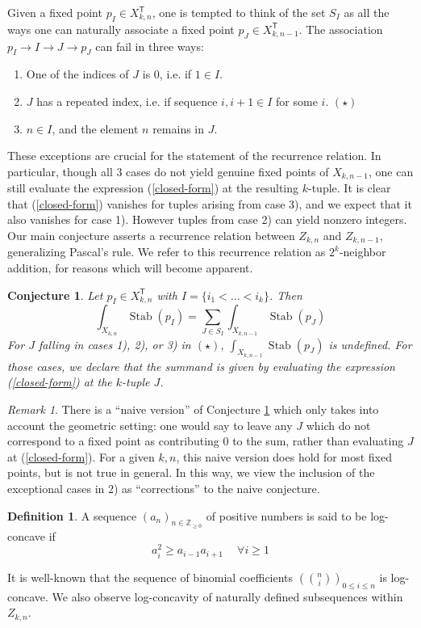 \documentclass[12 pt]{article}
\theoremstyle{plain}
\theoremstyle{plain}
\theoremstyle{plain}
\theoremstyle{plain}
\theoremstyle{plain}
\theoremstyle{plain}
\theoremstyle{plain}
\theoremstyle{plain}
\theoremstyle{plain}
\newtheorem{conjecture}[theorem]{Conjecture}
\theoremstyle{plain}
\theoremstyle{remark}
\newtheorem{remark}{Remark}[section]
\theoremstyle{remark}
\theoremstyle{definition}
\newtheorem{definition}{Definition}[section]
\theoremstyle{definition}
\theoremstyle{definition}
\theoremstyle{definition}
\theoremstyle{definition}
\theoremstyle{definition}
\DeclareMathOperator{\Stab}{Stab}
\newcommand{\bT}{\mathsf{T}}
\begin{document}
Given a fixed point $p_I \in X_{k,n}^\bT$, one is tempted to think of the set $S_I$ as all the ways one can naturally associate a fixed point $p_J\in X_{k,n-1 }^\bT$. The association $p_I\to I \to J \to p_J$ can fail in three ways:
\begin{enumerate}\label{eq:cases}
    \item One of the indices of $J$ is 0, i.e. if $1\in I$.
    \item $J$ has a repeated index, i.e. if sequence $i,i+1 \in I$ for some $i$. \hfill$(\star)$
    \item $n\in I$, and the element $n$ remains in $J$. 
\end{enumerate}
These exceptions are crucial for the statement of the recurrence relation. In particular, though all 3 cases do not yield genuine fixed points of $X_{k,n-1}$, one can still evaluate the expression (\ref{closed-form}) at the resulting $k$-tuple. It is clear that (\ref{closed-form}) vanishes for tuples arising from case 3), and we expect that it also vanishes for case 1). However tuples from case 2) can yield nonzero integers.
Our main conjecture asserts a recurrence relation between $Z_{k,n}$ and $Z_{k,n-1}$, generalizing Pascal's rule. We refer to this recurrence relation as $2^k$-neighbor addition, for reasons which will become apparent. 

\begin{conjecture}\label{2^k-nbr}
Let $p_I\in X_{k,n}^{\bT}$ with $I=\{i_{1}<\dots<i_{k}\}$. Then 
\[
\int_{X_{k,n}}\Stab(p_{I})=\sum_{J\in S_{I}}\int_{X_{k,n-1}}\Stab(p_{J})
\]
For $J$ falling in cases 1), 2), or 3) in $(\star)$, $\int_{X_{k,n-1}}\Stab(p_J)$ is undefined. For those cases, we declare that the summand is given by evaluating the expression (\ref{closed-form}) at the $k$-tuple $J$. 
\end{conjecture}

\begin{remark}
There is a ``naive version'' of Conjecture \ref{2^k-nbr} which only takes into account the geometric setting: one would say to leave any $J$ which do not correspond to a fixed point as contributing 0 to the sum, rather than evaluating $J$ at (\ref{closed-form}). For a given $k,n$, this naive version does hold for most fixed points, but is not true in general. In this way, we view the inclusion of the exceptional cases in 2) as ``corrections'' to the naive conjecture. 
\end{remark}

\begin{definition}
    A sequence $(a_{n})_{n\in\mathbb{Z}_{\geq 0}}$ of positive numbers is said to be log-concave if
    \[
    a_{i}^{2}\geq a_{i-1}a_{i+1}\ \quad \forall i\geq 1
    \]
\end{definition}
It is well-known that the sequence of binomial coefficients $\left(\binom{n}{i} \right )_{0\leq i\leq n}$ is log-concave. We also observe log-concavity of naturally defined subsequences within $Z_{k,n}$. 
\end{document}
